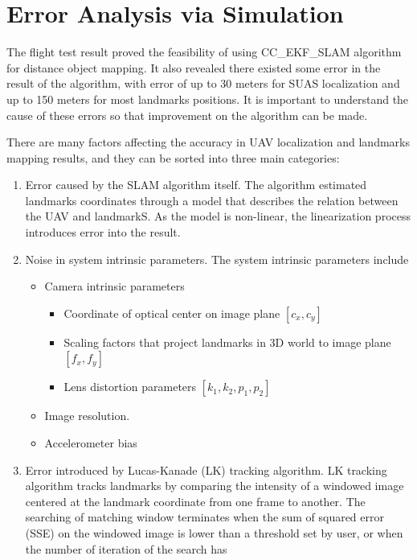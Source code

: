 \chapter{Error Analysis via Simulation}\label{ch:simulation}
The flight test result proved the feasibility of using CC\_EKF\_SLAM
algorithm for distance object mapping. It also revealed there existed
some error in the result of the algorithm, with error of up to 30
meters for SUAS localization and up to 150 meters for most landmarks
positions. It is important to understand the cause of these errors so
that improvement on the algorithm can be made.

There are many factors affecting the accuracy in UAV localization and
landmarks mapping results, and they can be sorted into three main
categories:

\begin{enumerate}
  \item Error caused by the SLAM algorithm itself. The algorithm
  estimated landmarks coordinates through a model that describes the
  relation between the UAV and landmarkS. As the model is non-linear,
  the linearization process introduces error into the result.
  \item Noise in system intrinsic parameters. The system intrinsic
  parameters include
  \begin{itemize}
    \item Camera intrinsic parameters
    \begin{itemize}
      \item Coordinate of optical center on image plane $[c_{x}, c_{y}]$
      \item Scaling factors that project landmarks in 3D world to image plane $ [f_{x}, f_{y}]$
      \item Lens distortion parameters $[k_{1}, k_{2}, p_{1}, p_{2}]$
    \end{itemize}
    \item Image resolution.
    \item Accelerometer bias %
  \end{itemize}
  \item Error introduced by Lucas-Kanade (LK) tracking algorithm. LK
  tracking algorithm tracks landmarks by comparing the intensity of a
  windowed image centered at the landmark coordinate from one frame to
  another. The searching of matching window terminates when the sum of
  squared error (SSE) on the windowed image is lower than a threshold
  set by user, or when the number of iteration of the search has

\end{enumerate}
